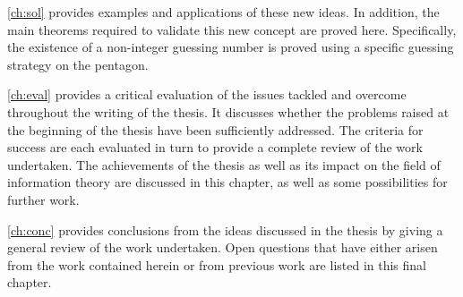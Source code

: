 \autoref{ch:sol} provides examples and applications of these new ideas. In addition, the main theorems required to validate this new concept are proved here. Specifically, the existence of a non-integer guessing number is proved using a specific guessing strategy on the pentagon.

\autoref{ch:eval} provides a critical evaluation of the issues tackled and overcome throughout the writing of the thesis. It discusses whether the problems raised at the beginning of the thesis have been sufficiently addressed. The criteria for success are each evaluated in turn to provide a complete review of the work undertaken. The achievements of the thesis as well as its impact on the field of information theory are discussed in this chapter, as well as some possibilities for further work.

\autoref{ch:conc} provides conclusions from the ideas discussed in the thesis by giving a general review of the work undertaken. Open questions that have either arisen from the work contained herein or from previous work are listed in this final chapter.